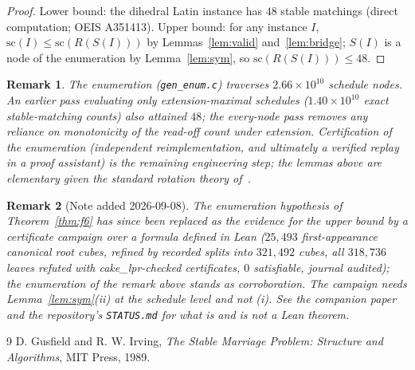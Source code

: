 \documentclass[11pt]{article}
\newtheorem{remark}{Remark}
\begin{document}
\begin{proof}
Lower bound: the dihedral Latin instance has $48$ stable matchings (direct
computation; OEIS A351413). Upper bound: for any instance $I$,
$\mathrm{sc}(I)\le\mathrm{sc}(R(S(I)))$ by Lemmas~\ref{lem:valid} and~\ref{lem:bridge};
$S(I)$ is a node of the enumeration by Lemma~\ref{lem:sym}, so
$\mathrm{sc}(R(S(I)))\le 48$.
\end{proof}

\begin{remark}
The enumeration (\texttt{gen\_enum.c}) traverses $2.66\times 10^{10}$ schedule nodes.
An earlier pass evaluating only extension-maximal schedules
($1.40\times10^{10}$ exact stable-matching counts) also attained $48$; the every-node
pass removes any reliance on monotonicity of the read-off count under extension.
Certification of the enumeration (independent reimplementation, and ultimately a
verified replay in a proof assistant) is the remaining engineering step; the lemmas
above are elementary given the standard rotation theory of~\cite{gi89}.
\end{remark}

\begin{remark}[Note added 2026-09-08]
The enumeration hypothesis of Theorem~\ref{thm:f6} has since been replaced as the evidence
for the upper bound by a certificate campaign over a formula defined in Lean
($25{,}493$ first-appearance canonical root cubes, refined by recorded splits into
$321{,}492$ cubes, all $318{,}736$ leaves refuted with cake\_lpr-checked certificates,
$0$ satisfiable, journal audited); the enumeration of the remark above stands as
corroboration. The campaign needs Lemma~\ref{lem:sym}(ii) at the schedule level and not
(i). See the companion paper and the repository's \texttt{STATUS.md} for what is and is
not a Lean theorem.
\end{remark}

\begin{thebibliography}{9}
 D. Gusfield and R. W. Irving, \emph{The Stable Marriage Problem:
Structure and Algorithms}, MIT Press, 1989.
\end{thebibliography}
\end{document}
